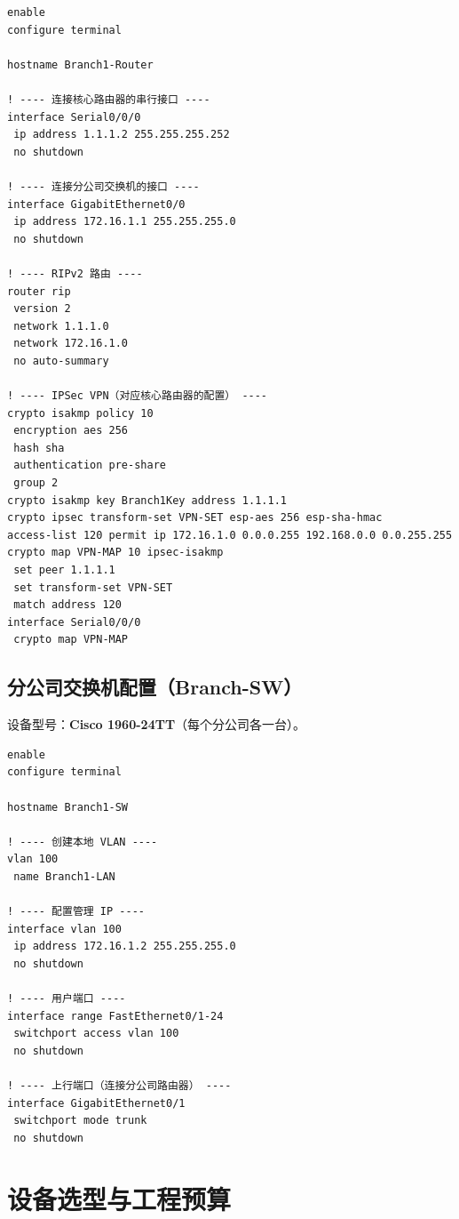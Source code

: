 \documentclass[12pt,a4paper]{ctexart}
\begin{document}
\begin{lstlisting}[caption={分公司路由器配置（以Branch1为例）}, label={lst:branch}]
enable
configure terminal

hostname Branch1-Router

! ---- 连接核心路由器的串行接口 ----
interface Serial0/0/0
 ip address 1.1.1.2 255.255.255.252
 no shutdown

! ---- 连接分公司交换机的接口 ----
interface GigabitEthernet0/0
 ip address 172.16.1.1 255.255.255.0
 no shutdown

! ---- RIPv2 路由 ----
router rip
 version 2
 network 1.1.1.0
 network 172.16.1.0
 no auto-summary

! ---- IPSec VPN（对应核心路由器的配置） ----
crypto isakmp policy 10
 encryption aes 256
 hash sha
 authentication pre-share
 group 2
crypto isakmp key Branch1Key address 1.1.1.1
crypto ipsec transform-set VPN-SET esp-aes 256 esp-sha-hmac
access-list 120 permit ip 172.16.1.0 0.0.0.255 192.168.0.0 0.0.255.255
crypto map VPN-MAP 10 ipsec-isakmp
 set peer 1.1.1.1
 set transform-set VPN-SET
 match address 120
interface Serial0/0/0
 crypto map VPN-MAP
\end{lstlisting}

\subsection{分公司交换机配置（Branch-SW）}

设备型号：\textbf{Cisco 1960-24TT}（每个分公司各一台）。

\begin{lstlisting}[caption={分公司交换机基础配置}, label={lst:branch-sw}]
enable
configure terminal

hostname Branch1-SW

! ---- 创建本地 VLAN ----
vlan 100
 name Branch1-LAN

! ---- 配置管理 IP ----
interface vlan 100
 ip address 172.16.1.2 255.255.255.0
 no shutdown

! ---- 用户端口 ----
interface range FastEthernet0/1-24
 switchport access vlan 100
 no shutdown

! ---- 上行端口（连接分公司路由器） ----
interface GigabitEthernet0/1
 switchport mode trunk
 no shutdown
\end{lstlisting}

\section{设备选型与工程预算}
\end{document}
